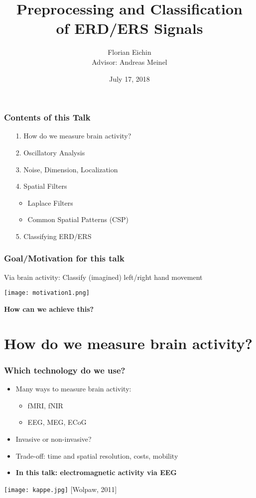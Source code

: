 \documentclass{beamer}
\title{Preprocessing and Classification \\ of ERD/ERS Signals}
\author{Florian Eichin \\ Advisor: Andreas Meinel}
\institute{Freiburg University}
\date{July 17, 2018}
\begin{document}
\maketitle

\begin{frame}
	\frametitle{Contents of this Talk}
	\begin{itemize}
	\item[1.] How do we measure brain activity?
	\item[2.] Oscillatory Analysis
	\item[3.] Noise, Dimension, Localization
	\item[4.] Spatial Filters
	\begin{itemize}
	\item Laplace Filters
	\item Common Spatial Patterns (CSP)
	\end{itemize}
	\item[5.] Classifying ERD/ERS
	\end{itemize}
\end{frame}

\begin{frame}
\frametitle{Goal/Motivation for this talk}
Via brain activity: Classify (imagined) left/right hand movement \\
	\begin{center}
	\texttt{[image: motivation1.png]}
	\end{center}
	{\bf How can we achieve this?}
\end{frame}

\section{How do we measure brain activity?}

\begin{frame}
\frametitle{Which technology do we use?}
	\begin{itemize}
	\item Many ways to measure brain activity:
	\begin{itemize}
		\item fMRI, fNIR
		\item EEG, MEG, ECoG
	\end{itemize}
	\item Invasive or non-invasive?
	\item Trade-off: time and spatial resolution, costs, mobility
	\item {\bf In this talk: electromagnetic activity via EEG}
	\end{itemize}
	\centering
	\texttt{[image: kappe.jpg]}
	{\tiny [Wolpaw, 2011]}
\end{frame}
\end{document}
